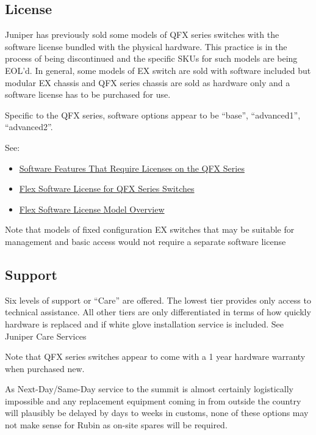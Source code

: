 \subsection{License}

Juniper has previously sold some models of QFX series switches with the software license bundled with the physical hardware.  This practice is in the process of being discontinued and the specific SKUs for such models are being EOL’d. In general, some models of EX switch are sold with software included but modular EX chassis and QFX series chassis are sold as hardware only and a software license has to be purchased for use.

Specific to the QFX series, software options appear to be “base”, “advanced1”, “advanced2”.

See:
\begin{itemize}
\item \href{https://www.juniper.net/documentation/en_US/release-independent/licensing/topics/topic-map/software_features_that_require_licenses.html}{Software Features That Require Licenses on the QFX Series}
\item \href{https://www.juniper.net/documentation/en_US/release-independent/licensing/topics/concept/flex-licenses-for-qfx.html}{Flex Software License for QFX Series Switches}
\item \href{https://www.juniper.net/documentation/en_US/release-independent/licensing/topics/topic-map/flex-software-subscription-model.html}{Flex Software License Model Overview}
\end{itemize}

Note that models of fixed configuration EX switches that may be suitable for management and basic access would not require a separate software license

\subsection{Support}

Six levels of support or “Care” are offered.  The lowest tier provides only access to technical assistance.  All other tiers are only differentiated in terms of how quickly hardware is replaced and if white glove installation service is included. See Juniper Care Services

Note that QFX series switches appear to come with a 1 year hardware warranty when purchased new.

As Next-Day/Same-Day service to the summit is almost certainly logistically impossible and any replacement equipment coming in from outside the country will plausibly be delayed by days to weeks in customs, none of these options may not make sense for Rubin as on-site spares will be required.

